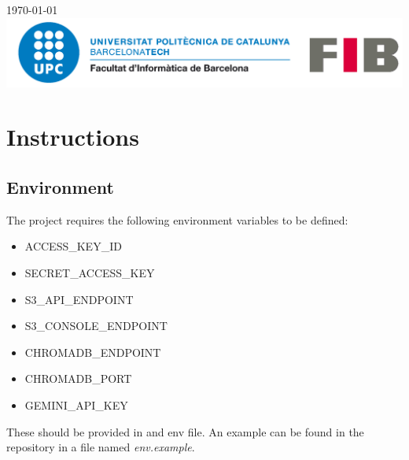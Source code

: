 \documentclass[12pt]{article}
\begin{document}
\begin{titlepage}
{\large \today}\\[2cm] %


\includegraphics[scale=0.3]{logo-upc.png}\\[1cm]
 

\vfill %

\end{titlepage}

\newpage

\tableofcontents
\thispagestyle{empty}


\newpage


\newpage

\section{Instructions}

\subsection{Environment}
The project requires the following environment variables to be defined:
\begin{itemize}
    \item ACCESS\_KEY\_ID
    \item SECRET\_ACCESS\_KEY
    \item S3\_API\_ENDPOINT
    \item S3\_CONSOLE\_ENDPOINT
    \item CHROMADB\_ENDPOINT
    \item CHROMADB\_PORT
    \item GEMINI\_API\_KEY
\end{itemize}
These should be provided in and env file. An example can be found in the repository in a file named \textit{env.example}.
\end{document}
